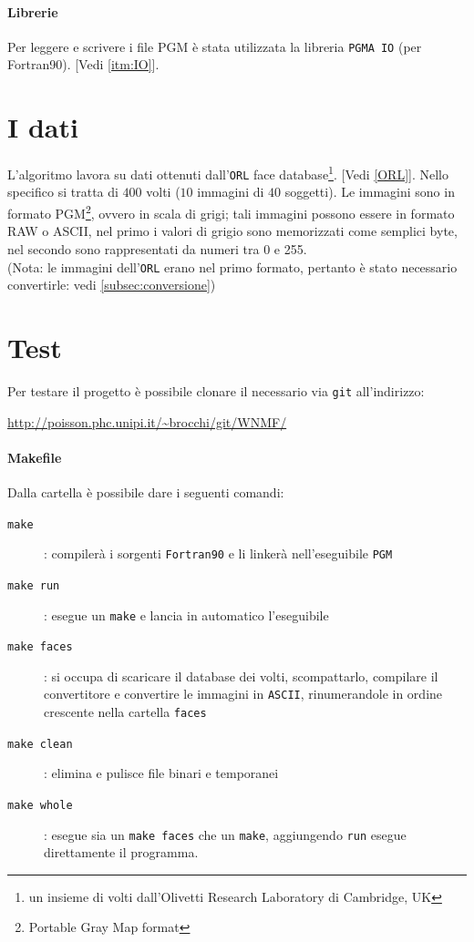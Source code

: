\documentclass[a4paper]{article} %
\begin{document}
\paragraph{Librerie}
Per leggere e scrivere i file PGM è stata utilizzata la libreria \texttt{PGMA IO} (per Fortran90).
[Vedi \ref{itm:IO}].

\section{I dati}
L'algoritmo lavora su dati ottenuti dall'\texttt{ORL} face database\footnote{un insieme di volti dall'Olivetti Research Laboratory di Cambridge, UK}. [Vedi \ref{ORL}].
Nello specifico si tratta di $400$ volti ($10$ immagini di $40$ soggetti). Le immagini sono in formato PGM\footnote{Portable Gray Map format}, ovvero in scala di grigi; tali immagini possono essere in formato RAW o ASCII, nel primo i valori di grigio sono memorizzati come semplici byte, nel secondo sono rappresentati da numeri tra 0 e 255. \\ 
(Nota: le immagini dell'\texttt{ORL} erano nel primo formato, pertanto è stato necessario convertirle: vedi \ref{subsec:conversione})

\section{Test}

Per testare il progetto è possibile clonare il necessario via \texttt{git} all'indirizzo:
\begin{center} \url{http://poisson.phc.unipi.it/~brocchi/git/WNMF/} \end{center}

\paragraph{Makefile}
Dalla cartella è possibile dare i seguenti comandi:
\begin{description}
\item[\texttt{make}]: compilerà i sorgenti \texttt{Fortran90} e li linkerà nell'eseguibile \texttt{PGM}
\item[\texttt{make run}]: esegue un \texttt{make} e lancia in automatico l'eseguibile
\item[\texttt{make faces}]: si occupa di scaricare il database dei volti, scompattarlo, compilare il convertitore e convertire le immagini in \texttt{ASCII}, rinumerandole in ordine crescente nella cartella \texttt{faces}
\item[\texttt{make clean}]: elimina e pulisce file binari e temporanei
\item[\texttt{make whole}]: esegue sia un \texttt{make faces} che un \texttt{make}, aggiungendo \texttt{run} esegue direttamente il programma.
\end{description}
\end{document}

